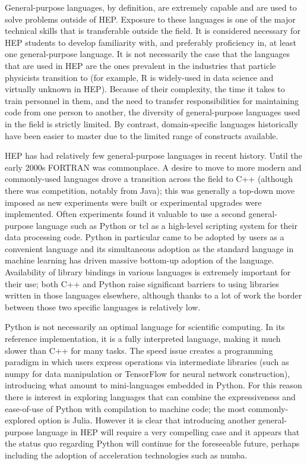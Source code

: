 General-purpose languages, by definition, are extremely capable and are used to solve problems outside of HEP. Exposure to these languages is one of the major technical skills that is transferable outside the field. It is considered necessary for HEP students to develop familiarity with, and preferably proficiency in, at least one general-purpose language. It is not necessarily the case that the languages that are used in HEP are the ones prevalent in the industries that particle physicists transition to (for example, R is widely-used in data science and virtually unknown in HEP). Because of their complexity, the time it takes to train personnel in them, and the need to transfer responsibilities for maintaining code from one person to another, the diversity of general-purpose languages used in the field is strictly limited. By contrast, domain-specific languages historically have been easier to master due to the limited range of constructs available.

HEP has had relatively few general-purpose languages in recent history. Until the early 2000s FORTRAN was commonplace. A desire to move to more modern and commonly-used languages drove a transition across the field to C++ (although there was competition, notably from Java); this was generally a top-down move imposed as new experiments were built or experimental upgrades were implemented. Often experiments found it valuable to use a second general-purpose language such as Python or tcl as a high-level scripting system for their data processing code. Python in particular came to be adopted by users as a convenient language and its simultaneous adoption as the standard language in machine learning has driven massive bottom-up adoption of the language. Availability of library bindings in various languages is extremely important for their use; both C++ and Python raise significant barriers to using libraries written in those languages elsewhere, although thanks to a lot of work the border between those two specific languages is relatively low.

Python is not necessarily an optimal language for scientific computing. In its reference implementation, it is a fully interpreted language, making it much slower than C++ for many tasks. The speed issue creates a programming paradigm in which users express operations via intermediate libraries (such as numpy for data manipulation or TensorFlow for neural network construction), introducing what amount to mini-languages embedded in Python. For this reason there is interest in exploring languages that can combine the expressiveness and ease-of-use of Python with compilation to machine code; the most commonly-explored option is Julia. However it is clear that introducing another general-purpose language in HEP will require a very compelling case and it appears that the status quo regarding Python will continue for the foreseeable future, perhaps including the adoption of acceleration technologies such as numba.


